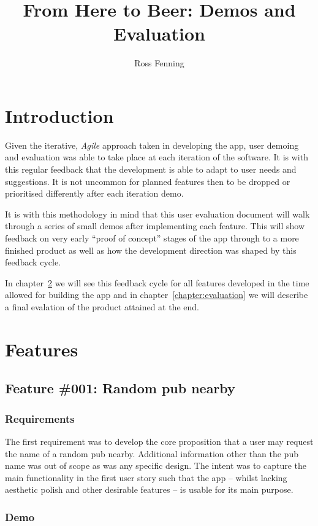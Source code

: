 \documentclass{report}
\title{From Here to Beer: Demos and Evaluation}
\author{Ross Fenning}
\begin{document}
\maketitle

\chapter{Introduction}

Given the iterative, \emph{Agile} approach taken in developing the app,
user demoing and evaluation was able to take place at each iteration of the
software. It is with this regular feedback that the development is able
to adapt to user needs and suggestions. It is not uncommon for planned
features then to be dropped or prioritised differently after each
iteration demo.

It is with this methodology in mind that this user evaluation document
will walk through a series of small demos after implementing each feature.
This will show feedback on very early ``proof of concept'' stages of
the app through to a more finished product as well as how the development
direction was shaped by this feedback cycle.

In chapter~\ref{chapter:features} we will see this feedback cycle for
all features developed in the time allowed for building the app and
in chapter~\ref{chapter:evaluation} we will describe a final evalation
of the product attained at the end.

\chapter{Features}
\label{chapter:features}
\section{Feature \#001: Random pub nearby}
\subsection{Requirements}
The first requirement was to develop the core proposition that a user may
request the name of a random pub nearby. Additional information other than
the pub name was out of scope as was any specific design. The intent was
to capture the main functionality in the first user story such that
the app -- whilst lacking aesthetic polish and other desirable features --
is usable for its main purpose.

\subsection{Demo}
\end{document}
